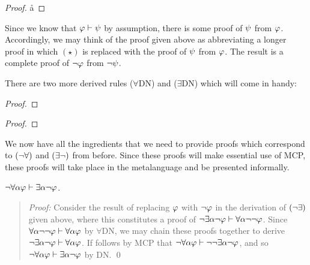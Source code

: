 \begin{proof}
	     \pr{}
    \open
            
            
       \r{a}
    \close
       
\end{proof}

Since we know that $\varphi \vdash \psi$ by assumption, there is some proof of $\psi$ from $\varphi$.
Accordingly, we may think of the proof given above as abbreviating a longer proof in which $(\star)$ is replaced with the proof of $\psi$ from $\varphi$.
The result is a complete proof of $\neg\varphi$ from $\neg\psi$. 

There are two more derived rules ($\forall$DN) and ($\exists$DN) which will come in handy:

\begin{multicols}{2}
  
\begin{proof}
	   \pr{}
    
              
                
\end{proof}

\begin{proof}
	   \pr{}
    \open
        \as{}
                  
                   
    \close
               
\end{proof}

\end{multicols}

We now have all the ingredients that we need to provide proofs which correspond to $(\neg\forall)$ and $(\exists\neg)$ from before.
Since these proofs will make essential use of MCP, these proofs will take place in the metalanguage and be presented informally.

\begin{Lthm}[$\enot\forall$] \label{lemma:NotForAll}
    $\neg\forall \alpha\varphi \vdash \exists \alpha\neg\varphi$.
\end{Lthm}

\begin{quote}
  \textit{Proof:}
  Consider the result of replacing $\varphi$ with $\neg\varphi$ in the derivation of $(\neg\exists)$ given above, where this constitutes a proof of $\neg\exists \alpha\neg\varphi \vdash \forall \alpha\neg\neg\varphi$.
  Since $\forall \alpha\neg\neg\varphi \vdash \forall \alpha\varphi$ by $\forall$DN, we may chain these proofs together to derive $\neg\exists \alpha\neg\varphi \vdash \forall \alpha\varphi$.
  If follows by MCP that $\neg\forall \alpha\varphi \vdash \neg\neg\exists \alpha\neg\varphi$, and so $\neg\forall \alpha\varphi \vdash \exists \alpha\neg\varphi$ by DN. 
  \qed
\end{quote}
  
